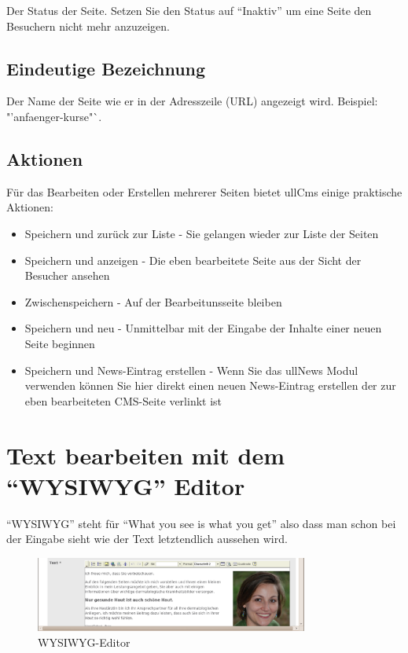 \documentclass[article, a4paper, oneside, 11pt]{memoir}
\begin{document}
Der Status der Seite. Setzen Sie den Status auf "`Inaktiv"' um eine Seite den Besuchern nicht mehr anzuzeigen.

\subsection{Eindeutige Bezeichnung}

Der Name der Seite wie er in der Adresszeile (URL) angezeigt wird. Beispiel: "'anfaenger-kurse"`.

\subsection{Aktionen}

Für das Bearbeiten oder Erstellen mehrerer Seiten bietet ullCms einige praktische Aktionen:

\begin{itemize}
\item Speichern und zurück zur Liste - Sie gelangen wieder zur Liste der Seiten
\item Speichern und anzeigen - Die eben bearbeitete Seite aus der Sicht der Besucher ansehen
\item Zwischenspeichern - Auf der Bearbeitunsseite bleiben
\item Speichern und neu - Unmittelbar mit der Eingabe der Inhalte einer neuen Seite beginnen
\item Speichern und News-Eintrag erstellen - Wenn Sie das ullNews Modul verwenden können Sie hier direkt einen neuen News-Eintrag erstellen der zur eben bearbeiteten CMS-Seite verlinkt ist
\end{itemize}

\section{Text bearbeiten mit dem "`WYSIWYG"' Editor}
\label{sec:editor}

"`WYSIWYG"' steht für "`What you see is what you get"' also dass man schon bei der Eingabe sieht wie der Text letztendlich aussehen wird.

\begin{figure}[htp]
\centering
\includegraphics[width=0.8\textwidth]{editor}
\caption{WYSIWYG-Editor}
\label{fig:editor}
\end{figure}
\end{document}
